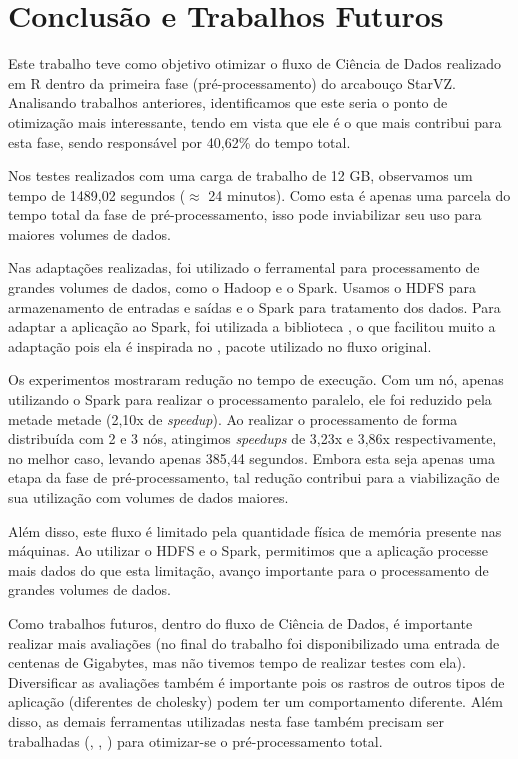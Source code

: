 \chapter{Conclusão e Trabalhos Futuros} \label{ch:conclusion}

Este trabalho teve como objetivo otimizar o fluxo de Ciência de Dados realizado 
em R dentro da primeira fase (pré-processamento) do arcabouço StarVZ. 
Analisando trabalhos anteriores, identificamos que este seria o ponto de 
otimização mais interessante, tendo em vista que ele é o que mais contribui 
para esta fase, sendo responsável por 40,62\% do tempo total.

Nos testes realizados com uma carga de trabalho de 12 GB, observamos um tempo 
de 1489,02 segundos ($\approx$ 24 minutos). Como esta é apenas uma parcela do 
tempo total da fase de pré-processamento, isso pode inviabilizar seu uso para 
maiores volumes de dados.

Nas adaptações realizadas, foi utilizado o ferramental para processamento de 
grandes volumes de dados, como o Hadoop e o Spark. Usamos o HDFS para 
armazenamento de entradas e saídas e o Spark para tratamento dos dados. Para 
adaptar a aplicação ao Spark, foi utilizada a biblioteca , o 
que facilitou muito a adaptação pois ela é inspirada no 
, pacote utilizado no fluxo original.

Os experimentos mostraram redução no tempo de execução. Com um nó, apenas 
utilizando o Spark para realizar o processamento paralelo, ele foi reduzido 
pela metade metade (2,10x de \emph{speedup}). Ao realizar o processamento de 
forma distribuída com 2 e 3 nós, atingimos \emph{speedups} de 3,23x e 3,86x 
respectivamente, no melhor caso, levando apenas 385,44 segundos. Embora esta 
seja apenas uma etapa da fase de pré-processamento, tal redução contribui para 
a viabilização de sua utilização com volumes de dados maiores.

Além disso, este fluxo é limitado pela quantidade física de memória presente 
nas máquinas. Ao utilizar o HDFS e o Spark, permitimos que a aplicação processe 
mais dados do que esta limitação, avanço importante para o processamento de 
grandes volumes de dados.

Como trabalhos futuros, dentro do fluxo de Ciência de Dados, é importante 
realizar mais avaliações (no final do trabalho foi disponibilizado uma entrada 
de centenas de Gigabytes, mas não tivemos tempo de realizar testes com ela). 
Diversificar as avaliações também é importante pois os rastros de outros tipos 
de aplicação (diferentes de cholesky) podem ter um comportamento diferente. 
Além disso, as demais ferramentas utilizadas nesta fase também precisam ser 
trabalhadas (, , 
) para otimizar-se o pré-processamento total.